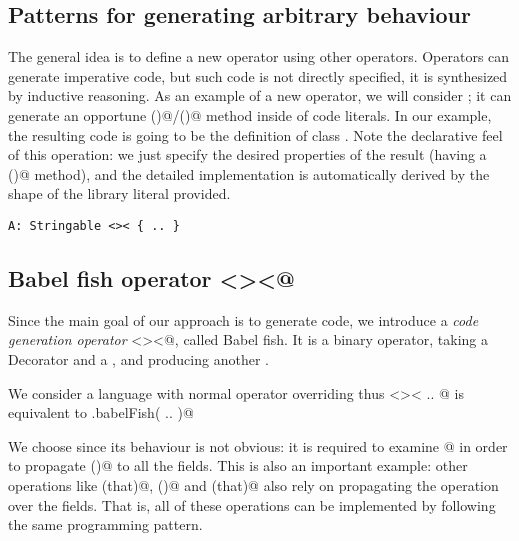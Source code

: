 \subsection*{Patterns for generating arbitrary behaviour}
The general idea is to define a new operator
using other operators.
Operators can generate imperative code, but such code is not directly
specified, it is synthesized by inductive reasoning.
As an example of a new operator, we will
consider \Q@Stringable@;
it can generate an opportune \Q@toS()@/\Q@toString()@ method inside of code literals.
In our example, the resulting code is going to be the definition
of class \Q@A@.
Note the declarative feel of this operation: we just specify the desired properties of the result (having a \Q@toS()@ method), and the detailed implementation is  
 automatically derived by the shape of the library literal provided.

\begin{lstlisting}
A: Stringable <>< { .. }
\end{lstlisting}

\subsection*{Babel fish operator \Q@<><@}
Since the main goal of our approach is to generate code, we introduce a \emph{code generation operator} \Q@<><@, called Babel fish.
It is a binary operator, taking a Decorator and a \Q@Library@, and producing another \Q@Library@.

We consider a language with normal operator overriding thus \Q@Stringable <>< { .. }@ is equivalent to \Q@Stringable.babelFish({ .. })@ 


We choose \Q@Stringable@ since its behaviour is not obvious: it is required to examine @ in order to 
propagate \Q@toS()@ to all the fields.
This is also an important example: other operations like \Q@equals(that)@, \Q@hashCode()@ and \Q@compare(that)@
also rely on propagating the operation over the fields.
That is, all of these operations can be implemented by
following the same programming pattern.


